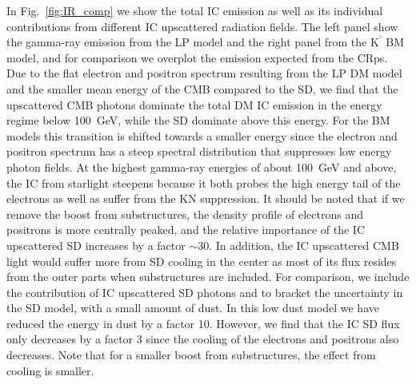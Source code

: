 \documentclass[10pt,aps,pra,reprint,amsmath,amsfonts,amssymb,showpacs,nofootinbib,floatfix]{revtex4-1}
\def\del#1{{}}
\newcommand{\rmn}{\mathrm}
\newcommand{\Kp}{\rmn{K}^\prime}
\begin{document}
In Fig.~\ref{fig:IR_comp} we show the total IC emission as well as its
individual contributions from different IC upscattered radiation
fields. The left panel show the gamma-ray emission from the LP model
and the right panel from the $\Kp$ BM model, and for comparison we
overplot the emission expected from the CRps. Due to the flat electron
and positron spectrum resulting from the LP DM model and the smaller
mean energy of the CMB compared to the SD, we find that the
upscattered CMB photons dominate the total DM IC emission in the
energy regime below 100~GeV, while the SD dominate above this
energy. For the BM models this transition is shifted towards a smaller
energy since the electron and positron spectrum has a steep spectral
distribution that suppresses low energy photon fields. \del{This
  suppression is also seen in the relative normalization of the flux
  where the IC from both CMB and dust photons are lower compared to
  the starlight simply because the starlight has a higher energy,
  hence it is upscattered by more abundant low energy electrons and
  positrons (c.f. Fig.~\ref{fig:q_DM}).} At the highest gamma-ray
energies of about 100~GeV and above, the IC from starlight steepens
because it both probes the high energy tail of the electrons as well
as suffer from the KN suppression. It should be noted that if we
remove the boost from substructures, the density profile of electrons
and positrons is more centrally peaked, and the relative importance
of the IC upscattered SD increases by a factor $\sim 30$. In
addition, the IC upscattered CMB light would suffer more from SD
cooling in the center as most of its flux resides from the outer parts
when substructures are included. For comparison, we include the
contribution of IC upscattered SD photons and to bracket the
uncertainty in the SD model, with a small amount of dust. In this low
dust model we have reduced the energy in dust by a factor 10. However,
we find that the IC SD flux only decreases by a factor 3 since the
cooling of the electrons and positrons also decreases. Note that for a
smaller boost from substructures, the effect from cooling is smaller.
\del{Even though the SD component seems to be suppressed compared to
  the CMB at energies around 100~MeV, it has a relative large impact
  on the steady state electron spectrum. If we remove the SD cooling,
  we find a factor two larger IC flux at low energies for a cluster of
  the size of Fornax. For more massive clusters we expect a larger IC
  flux from the SD component, but a smaller contribution from the CMB
  because of the more effective cooling.}
\end{document}
